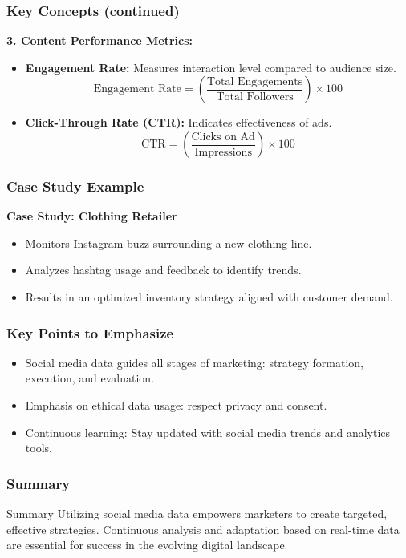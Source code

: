 \documentclass{beamer}
\begin{document}
\begin{frame}[fragile]
    \frametitle{Key Concepts (continued)}
    \textbf{3. Content Performance Metrics:}
    \begin{itemize}
        \item \textbf{Engagement Rate:} Measures interaction level compared to audience size.
        \begin{equation}
            \text{Engagement Rate} = \left( \frac{\text{Total Engagements}}{\text{Total Followers}} \right) \times 100
        \end{equation}
        \item \textbf{Click-Through Rate (CTR):} Indicates effectiveness of ads.
        \begin{equation}
            \text{CTR} = \left( \frac{\text{Clicks on Ad}}{\text{Impressions}} \right) \times 100
        \end{equation}
    \end{itemize}
\end{frame}

\begin{frame}[fragile]
    \frametitle{Case Study Example}
    \textbf{Case Study: Clothing Retailer}
    \begin{itemize}
        \item Monitors Instagram buzz surrounding a new clothing line.
        \item Analyzes hashtag usage and feedback to identify trends.
        \item Results in an optimized inventory strategy aligned with customer demand.
    \end{itemize}
\end{frame}

\begin{frame}[fragile]
    \frametitle{Key Points to Emphasize}
    \begin{itemize}
        \item Social media data guides all stages of marketing: strategy formation, execution, and evaluation.
        \item Emphasis on ethical data usage: respect privacy and consent.
        \item Continuous learning: Stay updated with social media trends and analytics tools.
    \end{itemize}
\end{frame}

\begin{frame}[fragile]
    \frametitle{Summary}
    \begin{block}{Summary}
        Utilizing social media data empowers marketers to create targeted, effective strategies. Continuous analysis and adaptation based on real-time data are essential for success in the evolving digital landscape.
    \end{block}
\end{frame}
\end{document}
